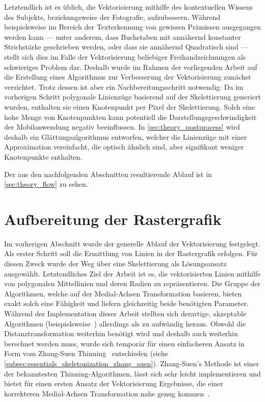 Letztendlich ist es üblich, die Vektorisierung mithilfe des kontextuellen Wissens des Subjekts, beziehungsweise der Fotografie, aufzubessern.
Während beispielsweise im Bereich der Texterkennung von gewissen Prämissen ausgegangen werden kann --- unter anderem, dass Buchstaben mit annähernd konstanter Strichstärke geschrieben werden, oder dass sie annähernd Quadratisch sind --- stellt sich dies im Falle der Vektorisierung beliebiger Freihandzeichnungen als schwieriges Problem dar.
Deshalb wurde im Rahmen der vorliegenden Arbeit auf die Erstellung eines Algorithmus zur Verbesserung der Vektorisierung zunächst verzichtet.
Trotz dessen ist aber ein Nachbereitungsschritt notwendig: Da im vorherigen Schritt polygonale Linienzüge basierend auf der Skelettierung generiert wurden, enthalten sie einen Knotenpunkt per Pixel der Skelettierung.
Solch eine hohe Menge von Knotenpunkten kann potentiell die Darstellungsgeschwindigkeit der Mobilanwendung negativ beeinflussen.
In \autoref{sec:theory_postprocess} wird deshalb ein Glättungsalgorithmus entworfen, welcher die Linienzüge mit einer Approximation vereinfacht, die optisch ähnlich sind, aber signifikant weniger Knotenpunkte enthalten.

Der aus den nachfolgenden Abschnitten resultierende Ablauf ist in \autoref{sec:theory_flow} zu sehen.

\clearpage
\section{Aufbereitung der Rastergrafik}%
\label{sec:theory_preprocess}

Im vorherigen Abschnitt wurde der generelle Ablauf der Vektorisierung festgelegt.
Als erster Schritt soll die Ermittlung von Linien in der Rastergrafik erfolgen.
Für diesen Zweck wurde der Weg über eine Skelettierung als Lösungsansatz ausgewählt.
Letztendliches Ziel der Arbeit ist es, die vektorisierten Linien mithilfe von polygonalen Mittellinien und deren Radien zu repräsentieren.
Die Gruppe der Algorithmen, welche auf der Medial-Achsen Transformation basieren, bieten exakt solch eine Fähigkeit und liefern gleichzeitig beide benötigten Parameter.
Während der Implementation dieser Arbeit stellten sich derartige, akzeptable Algorithmen (beispielsweise~\cite{DBLP:journals/cg/MonteroL12}) allerdings als zu aufwändig heraus.
Obwohl die Distanztransformation weiterhin benötigt wird und deshalb auch weiterhin berechnet werden muss, wurde sich temporär für einen einfacheren Ansatz in Form vom Zhang-Suen Thinning~\cite{DBLP:journals/cacm/ZhangS84} entschieden (siehe \autoref{subsec:essentials_skeletonization_zhang_suen}).
Zhang-Suen's Methode ist einer der bekanntesten Thinning-Algorithmen, lässt sich sehr leicht implementieren und bietet für einen ersten Ansatz der Vektorisierung Ergebnisse, die einer korrekteren Medial-Achsen Transformation nahe genug kommen~\cite{DBLP:journals/pami/LamLS92}.

